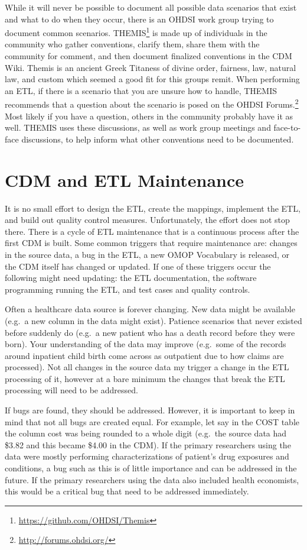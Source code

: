 \documentclass[11pt]{book}
\let\rmarkdownfootnote\footnote%
\def\footnote{\protect\rmarkdownfootnote}
\theoremstyle{definition}
\theoremstyle{definition}
\theoremstyle{definition}
\theoremstyle{remark}
\begin{document}
While it will never be possible to document all possible data scenarios
that exist and what to do when they occur, there is an OHDSI work group
trying to document common scenarios. THEMIS\footnote{\url{https://github.com/OHDSI/Themis}}
is made up of individuals in the community who gather conventions,
clarify them, share them with the community for comment, and then
document finalized conventions in the CDM Wiki. Themis is an ancient
Greek Titaness of divine order, fairness, law, natural law, and custom
which seemed a good fit for this groups remit. When performing an ETL,
if there is a scenario that you are unsure how to handle, THEMIS
recommends that a question about the scenario is posed on the OHDSI
Forums.\footnote{\url{http://forums.ohdsi.org/}} Most likely if you have
a question, others in the community probably have it as well. THEMIS
uses these discussions, as well as work group meetings and face-to-face
discussions, to help inform what other conventions need to be
documented.

\section{CDM and ETL Maintenance}\label{CDMandETLMaintenance}

It is no small effort to design the ETL, create the mappings, implement
the ETL, and build out quality control measures. Unfortunately, the
effort does not stop there. There is a cycle of ETL maintenance that is
a continuous process after the first CDM is built. Some common triggers
that require maintenance are: changes in the source data, a bug in the
ETL, a new OMOP Vocabulary is released, or the CDM itself has changed or
updated. If one of these triggers occur the following might need
updating: the ETL documentation, the software programming running the
ETL, and test cases and quality controls.

Often a healthcare data source is forever changing. New data might be
available (e.g.~a new column in the data might exist). Patience
scenarios that never existed before suddenly do (e.g.~a new patient who
has a death record before they were born). Your understanding of the
data may improve (e.g.~some of the records around inpatient child birth
come across as outpatient due to how claims are processed). Not all
changes in the source data my trigger a change in the ETL processing of
it, however at a bare minimum the changes that break the ETL processing
will need to be addressed.

If bugs are found, they should be addressed. However, it is important to
keep in mind that not all bugs are created equal. For example, let say
in the COST table the column cost was being rounded to a whole digit
(e.g.~the source data had \$3.82 and this became \$4.00 in the CDM). If
the primary researchers using the data were mostly performing
characterizations of patient's drug exposures and conditions, a bug such
as this is of little importance and can be addressed in the future. If
the primary researchers using the data also included health economists,
this would be a critical bug that need to be addressed immediately.
\end{document}
